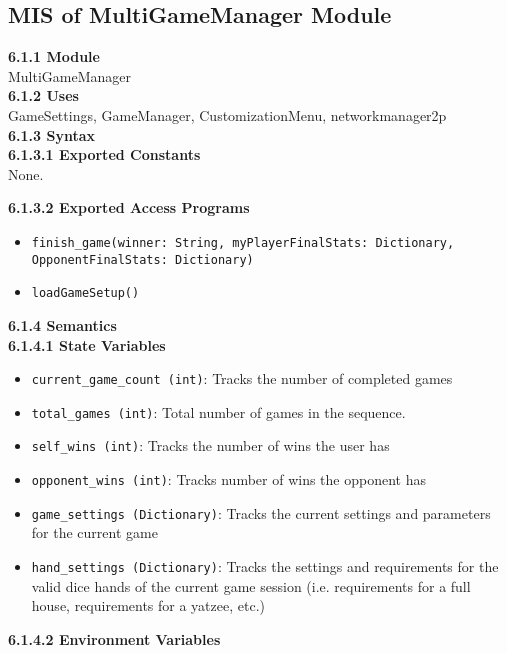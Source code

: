 \documentclass[12pt, titlepage]{article}
\begin{document}
\subsection{MIS of MultiGameManager Module}\label{MultiGameManager}
\textbf{6.1.1 Module}\\
\noindent MultiGameManager \\

\noindent \textbf{6.1.2 Uses}\\

GameSettings, GameManager, CustomizationMenu, networkmanager2p\\


\noindent \textbf{6.1.3 Syntax}\\
\textbf{6.1.3.1 Exported Constants}\\
None.  

\noindent \textbf{6.1.3.2 Exported Access Programs}
\begin{itemize}
    \item \texttt{finish\_game(winner: String, myPlayerFinalStats: Dictionary, OpponentFinalStats: Dictionary)}
    \item \texttt{loadGameSetup()}
\end{itemize}

\textbf{6.1.4 Semantics}\\
\textbf{6.1.4.1 State Variables}\\
\begin{itemize}
    \item \texttt{current\_game\_count (int)}: Tracks the number of completed games
    \item \texttt{total\_games (int)}: Total number of games in the sequence.
    \item \texttt{self\_wins (int)}: Tracks the number of wins the user has 
    \item \texttt{opponent\_wins (int)}: Tracks number of wins the opponent has
    \item \texttt{game\_settings (Dictionary)}: Tracks the current settings and parameters for the current game
    \item \texttt{hand\_settings (Dictionary)}: Tracks the settings and requirements for the valid dice hands of the current game session (i.e. requirements for a full house, requirements for a yatzee, etc.)

\end{itemize}

\textbf{6.1.4.2 Environment Variables}\\
\end{document}
